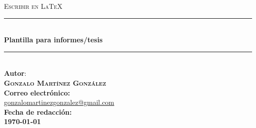 %
%
\begin{titlepage}
%
\newcommand{\HRule}{\rule{\linewidth}{0.5mm}}
\center
%
\textsc{\Large Escribir en \LaTeX}\\[0.5cm]
%
\HRule \\[0.4cm]%
{ \huge \bfseries Plantilla para informes/tesis}\\[0.4cm]
\HRule \\[1.5cm]%
%
\Large \textbf{Autor}:\\
\textsc{\textbf{Gonzalo Martínez González}}\\[1cm]
%
\large \textbf{Correo electrónico:}\\ \href{mailto:}{gonzalomartinezgonzalez@gmail.com}\\[1cm]
\large \textbf{Fecha de redacción:}\\
\textbf{\today}\\[1cm] 
%
%
%
\vfill%
%
\end{titlepage}
